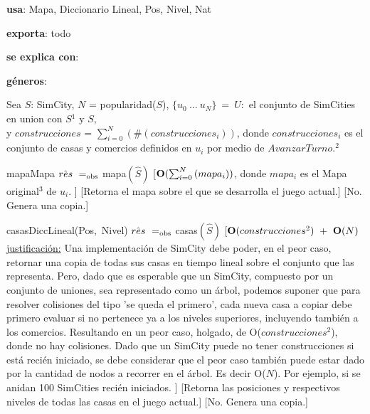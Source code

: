 \begin{Interfaz}

    \textbf{usa}: Mapa, Diccionario Lineal, Pos, Nivel, Nat 
    
    \textbf{exporta}: todo

    \textbf{se explica con}: 
  
    \textbf{géneros}: 
    
    
    Sea $S$: SimCity, $N$ = popularidad($S$), $\{u_0\ ...\ u_{N}\}\ =\ U:$ el conjunto de SimCities en union con $S$$^{1}$ y $S$, \\
    y $construcciones$ = $\sum_{i = 0}^{N}{}(\#(construcciones_i))$, donde $construcciones_i$
    es el conjunto de casas y comercios definidos en $u_i$ por medio de $AvanzarTurno$.$^{2}$ 

    \InterfazFuncion
    {mapa}{}{Mapa}
    {$\hat{res}\ \igobs\ $mapa$(\hat{S})$}
    [$\bold{O}(\sum_{i = 0}^{N}{}(mapa_i))$,
        donde $mapa_i$ es el Mapa original$^{3}$ de $u_i$.
    ]
    [Retorna el mapa sobre el que se desarrolla el juego actual.]
    [No. Genera una copia.]

    \InterfazFuncion
    {casas}{}{DiccLineal(Pos,\ Nivel)}
    {$\hat{res}\ \igobs\ $casas$(\hat{S})$}
    [$\bold{O}(construcciones^{2})\ +\ \bold{O}(N)$ %
        \\ \underline{justificación:} Una implementación de SimCity debe poder, en el peor caso, retornar una copia de todas sus casas en tiempo lineal sobre el conjunto que las representa. Pero, dado que es esperable que un SimCity, compuesto por un conjunto de uniones, sea representado como un árbol, podemos suponer que para resolver colisiones del tipo 'se queda el primero', cada nueva casa a copiar debe primero evaluar si no pertenece ya a los niveles superiores, incluyendo también a los comercios. Resultando en un peor caso, holgado, de O($construcciones^2$), donde no hay colisiones. Dado que un SimCity puede no tener construcciones si está recién iniciado, se debe considerar que el peor caso también puede estar dado por la cantidad de nodos a recorrer en el árbol. Es decir O($N$). Por ejemplo, 
        si se anidan 100 SimCities recién iniciados. 
    ]
    [Retorna las posiciones y respectivos niveles de todas las casas en el juego actual.]
    [No. Genera una copia.]


\end{Interfaz}
